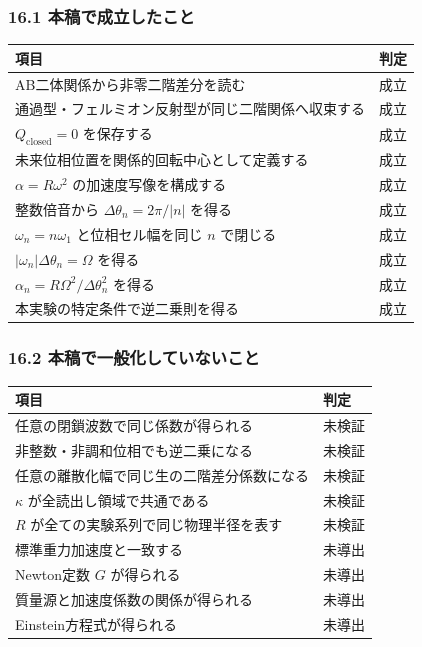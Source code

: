 \documentclass[
  a4paper,
]{ltjsarticle}
\newcounter{none} %
\begin{document}
\subsubsection{16.1
本稿で成立したこと}\label{ux672cux7a3fux3067ux6210ux7acbux3057ux305fux3053ux3068}

{\def\LTcaptype{none} %
\begin{longtable}[]{@{}ll@{}}
\toprule\noalign{}
項目 & 判定 \\
\midrule\noalign{}
\endhead
\bottomrule\noalign{}
\endlastfoot
AB二体関係から非零二階差分を読む & 成立 \\
通過型・フェルミオン反射型が同じ二階関係へ収束する & 成立 \\
\(Q_{\mathrm{closed}}=0\) を保存する & 成立 \\
未来位相位置を関係的回転中心として定義する & 成立 \\
\(\alpha=R\omega^2\) の加速度写像を構成する & 成立 \\
整数倍音から \(\Delta\theta_n=2\pi/\lvert n\rvert\) を得る & 成立 \\
\(\omega_n=n\omega_1\) と位相セル幅を同じ \(n\) で閉じる & 成立 \\
\(\lvert\omega_n\rvert\Delta\theta_n=\Omega\) を得る & 成立 \\
\(\alpha_n=R\Omega^2/\Delta\theta_n^2\) を得る & 成立 \\
本実験の特定条件で逆二乗則を得る & 成立 \\
\end{longtable}
}

\subsubsection{16.2
本稿で一般化していないこと}\label{ux672cux7a3fux3067ux4e00ux822cux5316ux3057ux3066ux3044ux306aux3044ux3053ux3068}

{\def\LTcaptype{none} %
\begin{longtable}[]{@{}ll@{}}
\toprule\noalign{}
項目 & 判定 \\
\midrule\noalign{}
\endhead
\bottomrule\noalign{}
\endlastfoot
任意の閉鎖波数で同じ係数が得られる & 未検証 \\
非整数・非調和位相でも逆二乗になる & 未検証 \\
任意の離散化幅で同じ生の二階差分係数になる & 未検証 \\
\(\kappa\) が全読出し領域で共通である & 未検証 \\
\(R\) が全ての実験系列で同じ物理半径を表す & 未検証 \\
標準重力加速度と一致する & 未導出 \\
Newton定数 \(G\) が得られる & 未導出 \\
質量源と加速度係数の関係が得られる & 未導出 \\
Einstein方程式が得られる & 未導出 \\
\end{longtable}
}
\end{document}
